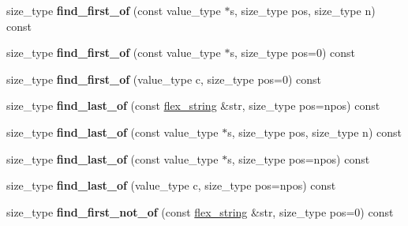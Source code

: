 \begin{DoxyCompactItemize}
\item 
\hypertarget{classflex__string_ad20dd6173ab4a096bb205d9164415c8c}{}size\+\_\+type {\bfseries find\+\_\+first\+\_\+of} (const value\+\_\+type $\ast$s, size\+\_\+type pos, size\+\_\+type n) const \label{classflex__string_ad20dd6173ab4a096bb205d9164415c8c}

\item 
\hypertarget{classflex__string_a1ff8c110a4a4d2b87c6fcc0bc5bbc862}{}size\+\_\+type {\bfseries find\+\_\+first\+\_\+of} (const value\+\_\+type $\ast$s, size\+\_\+type pos=0) const \label{classflex__string_a1ff8c110a4a4d2b87c6fcc0bc5bbc862}

\item 
\hypertarget{classflex__string_a40614ca7a1de7f52a3be046ab2f9cc96}{}size\+\_\+type {\bfseries find\+\_\+first\+\_\+of} (value\+\_\+type c, size\+\_\+type pos=0) const \label{classflex__string_a40614ca7a1de7f52a3be046ab2f9cc96}

\item 
\hypertarget{classflex__string_a2c1939f46e585de400e11dd55ee2a8c8}{}size\+\_\+type {\bfseries find\+\_\+last\+\_\+of} (const \hyperlink{classflex__string}{flex\+\_\+string} \&str, size\+\_\+type pos=npos) const \label{classflex__string_a2c1939f46e585de400e11dd55ee2a8c8}

\item 
\hypertarget{classflex__string_a3415f16cc01dcd00a07473aac9eeaf6d}{}size\+\_\+type {\bfseries find\+\_\+last\+\_\+of} (const value\+\_\+type $\ast$s, size\+\_\+type pos, size\+\_\+type n) const \label{classflex__string_a3415f16cc01dcd00a07473aac9eeaf6d}

\item 
\hypertarget{classflex__string_a76de2577f86988ad6a06f62502c3803d}{}size\+\_\+type {\bfseries find\+\_\+last\+\_\+of} (const value\+\_\+type $\ast$s, size\+\_\+type pos=npos) const \label{classflex__string_a76de2577f86988ad6a06f62502c3803d}

\item 
\hypertarget{classflex__string_ad97f67c48a9dee1a6d027ec22569cce7}{}size\+\_\+type {\bfseries find\+\_\+last\+\_\+of} (value\+\_\+type c, size\+\_\+type pos=npos) const \label{classflex__string_ad97f67c48a9dee1a6d027ec22569cce7}

\item 
\hypertarget{classflex__string_a721561dd249367b0919c25feab562aec}{}size\+\_\+type {\bfseries find\+\_\+first\+\_\+not\+\_\+of} (const \hyperlink{classflex__string}{flex\+\_\+string} \&str, size\+\_\+type pos=0) const \label{classflex__string_a721561dd249367b0919c25feab562aec}


\end{DoxyCompactItemize}
